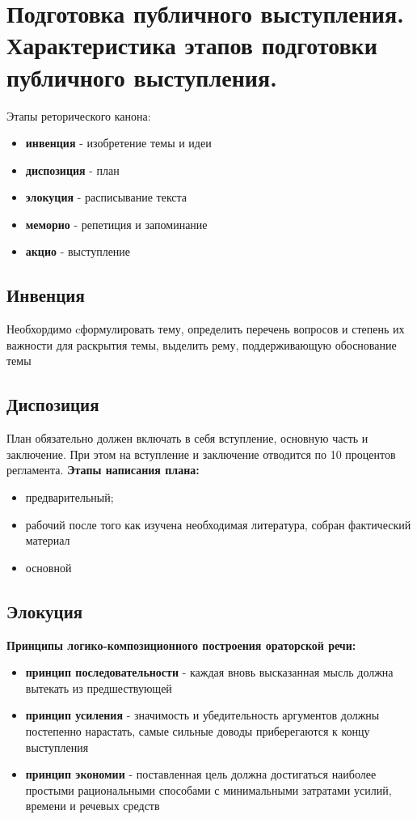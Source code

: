 \section{Подготовка публичного выступления. Характеристика этапов подготовки публичного выступления.}
Этапы реторического канона:
\begin{itemize}
	\item \textbf{инвенция} - изобретение темы и идеи
	\item \textbf{диспозиция} - план
	\item \textbf{элокуция} - расписывание текста
	\item \textbf{меморио} - репетиция и запоминание
	\item \textbf{акцио} - выступление
\end{itemize}

\subsection{Инвенция}
Необхордимо cформулировать тему, определить перечень вопросов и степень их важности для раскрытия темы, выделить рему, поддерживающую обоснование темы

\subsection{Диспозиция}
План обязательно должен включать в себя вступление, основную часть и заключение. При
этом на вступление и заключение отводится по 10 процентов регламента.
\textbf{Этапы написания плана:}
\begin{itemize}
	\item предварительный;
	\item рабочий после того как изучена необходимая литература, собран фактический материал
	\item основной
\end{itemize}

\subsection{Элокуция}

\textbf{Принципы логико-композиционного построения ораторской речи:}
\begin{itemize}
	\item \textbf{принцип последовательности} - каждая вновь высказанная мысль должна вытекать из предшествующей
	\item \textbf{принцип усиления} - значимость и убедительность аргументов должны постепенно нарастать, самые сильные доводы приберегаются к концу выступления
	\item \textbf{принцип экономии} - поставленная цель должна достигаться наиболее простыми рациональными способами с минимальными затратами усилий, времени и речевых средств
\end{itemize}

